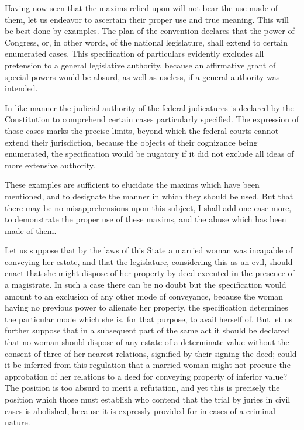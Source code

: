 Having now seen that the maxims relied upon will not bear the use made of them, let us endeavor to ascertain their proper use and true meaning. 
This will be best done by examples. 
The plan of the convention declares that the power of Congress, or, in other words, of the national legislature, shall extend to certain enumerated cases. 
This specification of particulars evidently excludes all pretension to a general legislative authority, because an affirmative grant of special powers would be absurd, as well as useless, if a general authority was intended.

In like manner the judicial authority of the federal judicatures is declared by the Constitution to comprehend certain cases particularly specified. 
The expression of those cases marks the precise limits, beyond which the federal courts cannot extend their jurisdiction, because the objects of their cognizance being enumerated, the specification would be nugatory if it did not exclude all ideas of more extensive authority.

These examples are sufficient to elucidate the maxims which have been mentioned, and to designate the manner in which they should be used. 
But that there may be no misapprehensions upon this subject, I shall add one case more, to demonstrate the proper use of these maxims, and the abuse which has been made of them.

Let us suppose that by the laws of this State a married woman was incapable of conveying her estate, and that the legislature, considering this as an evil, should enact that she might dispose of her property by deed executed in the presence of a magistrate. 
In such a case there can be no doubt but the specification would amount to an exclusion of any other mode of conveyance, because the woman having no previous power to alienate her property, the specification determines the particular mode which she is, for that purpose, to avail herself of. 
But let us further suppose that in a subsequent part of the same act it should be declared that no woman should dispose of any estate of a determinate value without the consent of three of her nearest relations, signified by their signing the deed; could it be inferred from this regulation that a married woman might not procure the approbation of her relations to a deed for conveying property of inferior value? 
The position is too absurd to merit a refutation, and yet this is precisely the position which those must establish who contend that the trial by juries in civil cases is abolished, because it is expressly provided for in cases of a criminal nature.

